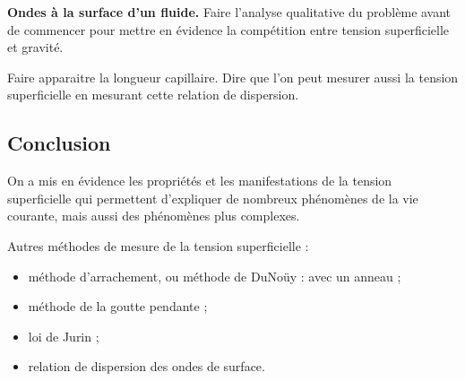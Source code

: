 \begin{slide}
\textbf{Ondes à la surface d'un fluide.}
Faire l'analyse qualitative du problème avant de commencer pour mettre en évidence la compétition entre tension superficielle et gravité.
\end{slide}
Faire apparaitre la longueur capillaire.
Dire que l'on peut mesurer aussi la tension superficielle en mesurant cette relation de dispersion.


\subsection*{Conclusion}

On a mis en évidence les propriétés et les manifestations de la tension superficielle qui permettent d'expliquer de nombreux phénomènes de la vie courante, mais aussi des phénomènes plus complexes.

\begin{remarque}
Autres méthodes de mesure de la tension superficielle :
\begin{itemize}
\item méthode d'arrachement, ou méthode de DuNoüy : avec un anneau ;
\item méthode de la goutte pendante ;
\item loi de Jurin ;
\item relation de dispersion des ondes de surface.
\end{itemize}
\end{remarque}

\newpage